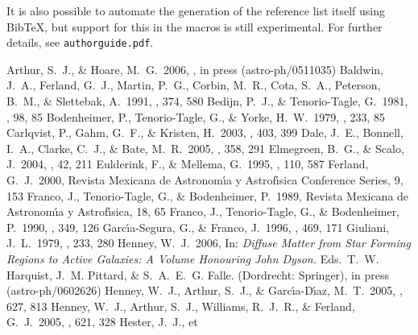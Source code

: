 \documentclass[preprint]{rmxac}
\begin{document}
It is also possible to automate the generation of the reference list
itself using BibTeX, but support for this in the macros is still
experimental. For further details, see \texttt{authorguide.pdf}.


\begin{thebibliography}
 Arthur, S.~J., \&
Hoare, M.~G.\ 2006, \apj, in press (astro-ph/0511035)
 Baldwin, J.~A., 
Ferland, G.~J., Martin, P.~G., Corbin, M.~R., Cota, S.~A., Peterson, B.~M., 
\& Slettebak, A.\ 1991, \apj, 374, 580 
 Bedijn, P.~J., 
\& Tenorio-Tagle, G.\ 1981, \aap, 98, 85 
 Bodenheimer, P., 
Tenorio-Tagle, G., \& Yorke, H.~W.\ 1979, \apj, 233, 85 
 Carlqvist, P., Gahm, 
G.~F., \& Kristen, H.\ 2003, \aap, 403, 399 
 Dale, J.~E., Bonnell, 
I.~A., Clarke, C.~J., \& Bate, M.~R.\ 2005, \mnras, 358, 291 
 Elmegreen,
B.~G., \& Scalo, J.\ 2004, \araa, 42, 211 
 Eulderink, F., \& 
Mellema, G.\ 1995, \aaps, 110, 587 
 Ferland, G.~J.\ 2000, Revista 
Mexicana de Astronom\'\i{}a y Astrof\'\i{}sica Conference Series, 9, 153 
 Franco, J., 
Tenorio-Tagle, G., \& Bodenheimer, P.\ 1989, Revista Mexicana de
Astronom\'\i{}a y Astrof\'\i{}sica, 18, 65 
 Franco, J., 
Tenorio-Tagle, G., \& Bodenheimer, P.\ 1990, \apj, 349, 126 
  Garc\'\i a-Segura, G., \& Franco, J.\ 1996, \apj, 469, 171
 Giuliani, J.~L.\ 1979,
\apj, 233, 280 
 Henney, W.~J.\ 2006, In:
  \textit{Diffuse Matter from Star Forming Regions to Active Galaxies:
    A Volume Honouring John Dyson.} Eds.\ T.~W. Harquist,
  J.~M. Pittard, \& S.~A.~E.~G. Falle. (Dordrecht: Springer), in press
  (astro-ph/0602626)
  Henney, W.~J.,
Arthur, S.~J., \& Garc{\'{\i}}a-D{\'{\i}}az, M.~T.\ 2005, \apj, 627, 813 
 Henney, W.~J., Arthur, 
S.~J., Williams, R.~J.~R., \& Ferland, G.~J.\ 2005, \apj, 621, 328 
 Hester, J.~J., et

\end{thebibliography}
\end{document}
